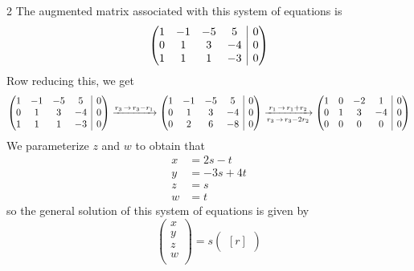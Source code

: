 \documentclass{article}
\makeatletter
\newenvironment{amatrix}[1]{%
  \left(\begin{array}{@{}*{#1}{c}|c@{}}
}{%
  \end{array}\right)
}
\theoremstyle{plain} %
\numberwithin{thm}{section} %
\theoremstyle{definition}
\makeatother
\begin{document}
\begin{question}{2}
        The augmented matrix associated with this system of equations is
        \[
            \begin{amatrix}{4}
                1 & -1 & -5 & 5 & 0 \\
                0 & 1 & 3 & -4 & 0 \\
                1 & 1 & 1 & -3 & 0
            \end{amatrix}
        \]
        Row reducing this, we get
        \begin{align*}
            \begin{amatrix}{4}
                1 & -1 & -5 & 5 & 0 \\
                0 & 1 & 3 & -4 & 0 \\
                1 & 1 & 1 & -3 & 0
            \end{amatrix}
            \xrightarrow{r_3\,\to\,r_3 - r_1}
            \begin{amatrix}{4}
                1 & -1 & -5 & 5 & 0 \\
                0 & 1 & 3 & -4 & 0 \\
                0 & 2 & 6 & -8 & 0
            \end{amatrix}
            \xrightarrow[r_3\,\to\,r_3 - 2r_2]{r_1\,\to\,r_1 + r_2}
            \begin{amatrix}{4}
                1 & 0 & -2 & 1 & 0 \\
                0 & 1 & 3 & -4 & 0 \\
                0 & 0 & 0 & 0 & 0
            \end{amatrix}
        \end{align*}
        We parameterize \(z\) and \(w\) to obtain that
        \begin{align*}
            x &= 2s - t \\
            y &= -3s + 4t \\
            z &= s \\
            w &= t
        \end{align*}
        so the general solution of this system of equations is given by
        \[
            \begin{pmatrix*}
                 x \\
                 y \\
                 z \\
                 w \\
            \end{pmatrix*}
            =
            s\begin{pmatrix*}[r]

\end{pmatrix*}\]
\end{question}
\end{document}

